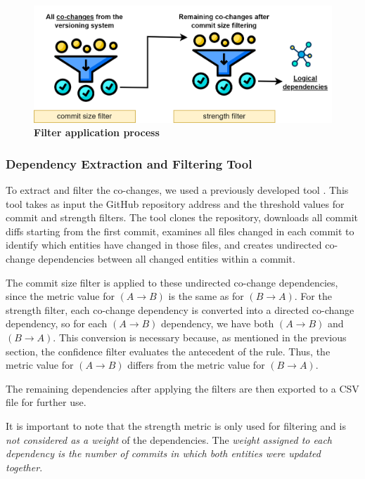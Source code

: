 \documentclass{ieeeaccess}
\begin{document}
\begin{figure}[t!]
  \centering
  \includegraphics[width=\columnwidth]{filtering.png}
  \caption{ \textbf{Filter application process}}
  \label{fig:filtering}
\end{figure}

\subsubsection{Dependency Extraction and Filtering Tool}

To extract and filter the co-changes, we used a previously developed tool \cite{b4}. This tool takes as input the GitHub repository address and the threshold values for commit and strength filters. The tool clones the repository, downloads all commit diffs starting from the first commit, examines all files changed in each commit to identify which entities have changed in those files, and creates undirected co-change dependencies between all changed entities within a commit.

The commit size filter is applied to these undirected co-change dependencies, since the metric value for $(A \rightarrow B)$ is the same as for $(B \rightarrow A)$. For the strength filter, each co-change dependency is converted into a directed co-change dependency, so for each $(A \rightarrow B)$ dependency, we have both $(A \rightarrow B)$ and $(B \rightarrow A)$. This conversion is necessary because, as mentioned in the previous section, the confidence filter evaluates the antecedent of the rule. Thus, the metric value for $(A \rightarrow B)$ differs from the metric value for $(B \rightarrow A)$. 

The remaining dependencies after applying the filters are then exported to a CSV file for further use.

It is important to note that the strength metric is only used for filtering and is \textit{not considered as a weight} of the dependencies. The \textit{weight assigned to each dependency is the number of commits in which both entities were updated together}.
\end{document}
